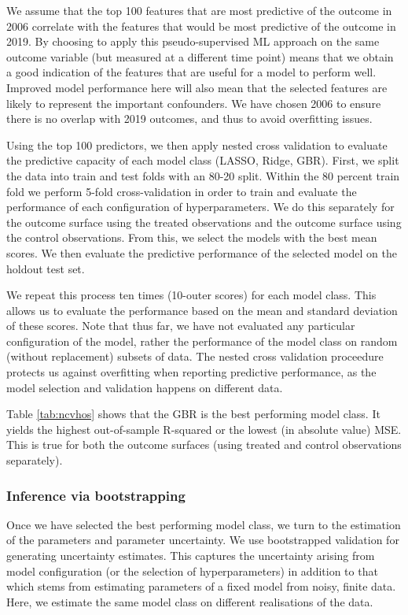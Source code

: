 \documentclass[12pt, a4paper]{article}
\begin{document}
We assume that the top 100 features that are most predictive of the outcome in 2006 correlate with the features that would be most predictive of the outcome in 2019. By choosing to apply this pseudo-supervised ML approach on the same outcome variable (but measured at a different time point) means that we obtain a good indication of the features that are useful for a model to perform well. Improved model performance here will also mean that the selected features are likely to represent the important confounders. We have chosen 2006 to ensure there is no overlap with 2019 outcomes, and thus to avoid overfitting issues. 

Using the top 100 predictors, we then apply nested cross validation to evaluate
the predictive capacity of each model class (LASSO, Ridge, GBR). First, we
split the data into train and test folds with an 80-20 split. Within the 80
percent train fold we perform 5-fold cross-validation in order to train and
evaluate the performance of each configuration of hyperparameters. We do this
separately for the outcome surface using the treated observations and the
outcome surface using the control observations. From this, we select the models
with the best mean scores. We then evaluate the predictive performance of the
selected model on the holdout test set. 

We repeat this process ten times (10-outer scores) for each model class. This
allows us to evaluate the performance based on the mean and standard deviation
of these scores. Note that thus far, we have not evaluated any particular
configuration of the model, rather the performance of the model class on random
(without replacement) subsets of data. The nested cross validation proceedure
protects us against overfitting when reporting predictive performance, as the
model selection and validation happens on different data.

Table \ref{tab:ncvhos} shows that the GBR is the best performing model class.
It yields the highest out-of-sample R-squared or the lowest (in absolute value)
MSE. This is true for both the outcome surfaces (using treated and control
observations separately). 

\subsubsection*{Inference via bootstrapping}

Once we have selected the best performing model class, we turn to the estimation of the parameters and parameter uncertainty. We use bootstrapped validation for generating uncertainty estimates. This captures the uncertainty arising from model configuration (or the selection of hyperparameters) in addition to that which stems from estimating parameters of a fixed model from noisy, finite data. Here, we estimate the same model class on different realisations of the data. 
\end{document}
